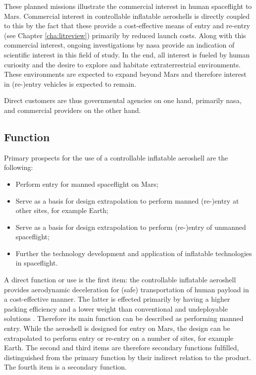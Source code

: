 These planned missions illustrate the commercial interest in human spaceflight to Mars. Commercial interest in controllable inflatable aeroshells is directly coupled to this by the fact that these provide a cost-effective means of entry and re-entry (see Chapter \ref{cha:litreview}) primarily by reduced launch costs. Along with this commercial interest, ongoing investigations by \gls{nasa} provide an indication of scientific interest in this field of study. In the end, all interest is fueled by human curiosity and the desire to explore and habitate extraterrestrial environments. These environments are expected to expand beyond Mars and therefore interest in (re-)entry vehicles is expected to remain.

Direct customers are thus governmental agencies on one hand, primarily \gls{nasa}, and commercial providers on the other hand. 

\subsection{Function}
Primary prospects for the use of a controllable inflatable aeroshell are the following:
\begin{itemize}
\item Perform entry for manned spaceflight on Mars;
\item Serve as a basis for design extrapolation to perform manned (re-)entry at other sites, for example Earth;
\item Serve as a basis for design extrapolation to perform (re-)entry of unmanned spaceflight;
\item Further the technology development and application of inflatable technologies in spaceflight.
\end{itemize}
A direct function or use is the first item: the controllable inflatable aeroshell provides aerodynamic deceleration for (safe) transportation of human payload in a cost-effective manner. The latter is effected primarily by having a higher packing efficiency and a lower weight than conventional and undeployable solutions \cite{Hughes2005, Cianciolo2010}. Therefore its main function can be described as performing manned entry. While the aeroshell is designed for entry on Mars, the design can be extrapolated to perform entry or re-entry on a number of sites, for example Earth. The second and third items are therefore secondary functions fulfilled, distinguished from the primary function by their indirect relation to the product. The fourth item is a secondary function.

